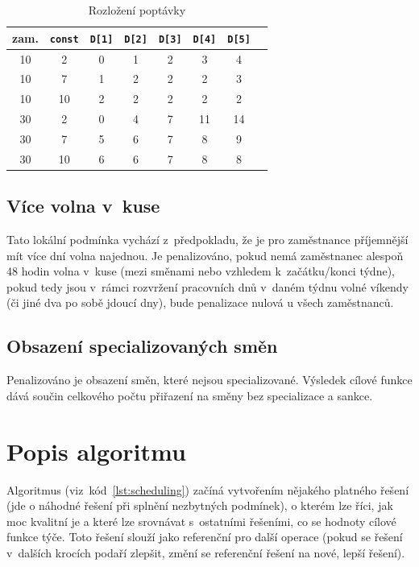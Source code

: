 \documentclass[twoside]{ctuthesis}
\begin{document}
\begin{table}[h]
	\caption{Rozložení poptávky}
	\label{tab:demandfactor}
	\begin{tabular}{c|c|cccccc}
		\hline
		zam. & \texttt{const} & \texttt{D[1]} & \texttt{D[2]} & \texttt{D[3]} & \texttt{D[4]} & \texttt{D[5]} \\
		\hline
		\rowcolor{Gray}
		10 & 2 & 0 & 1 & 2 & 3 & 4 \\
		10 & 7 & 1 & 2 & 2 & 2 & 3 \\
		\rowcolor{Gray}
		10 & 10 & 2 & 2 & 2 & 2 & 2 \\
		30 & 2 & 0 & 4 & 7 & 11 & 14 \\
		\rowcolor{Gray}
		30 & 7 & 5 & 6 & 7 & 8 & 9 \\
		30 & 10 & 6 & 6 & 7 & 8 & 8 \\
		\hline
	\end{tabular}
\end{table}


\subsection{Více volna v~kuse}
Tato lokální podmínka vychází z~předpokladu, že je pro zaměstnance příjemnější mít více dní volna najednou. Je penalizováno, pokud nemá zaměstnanec alespoň 48 hodin volna v~kuse (mezi směnami nebo vzhledem k~začátku/konci týdne), pokud tedy jsou v~rámci rozvržení pracovních dnů v~daném týdnu volné víkendy (či jiné dva po sobě jdoucí dny), bude penalizace nulová u všech zaměstnanců.

\subsection{Obsazení specializovaných směn}
Penalizováno je obsazení směn, které nejsou specializované. Výsledek cílové funkce dává součin celkového počtu přiřazení na směny bez specializace a sankce.

\section{Popis algoritmu}
Algoritmus (viz~kód~\ref{lst:scheduling}) začíná vytvořením nějakého platného řešení (jde o náhodné řešení při splnění nezbytných podmínek), o kterém lze říci, jak moc kvalitní je a které lze srovnávat s~ostatními řešeními, co se hodnoty cílové funkce týče. Toto řešení slouží jako referenční pro další operace (pokud se řešení v~dalších krocích podaří zlepšit, změní se referenční řešení na nové, lepší řešení).
\end{document}
